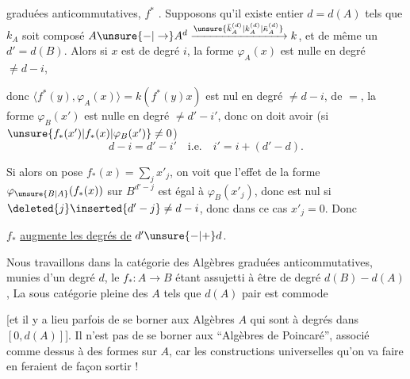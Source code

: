graduées anticommutatives, $f^*$ . Supposons qu'il existe  entier $d=d(A)$ tels que $k_A$ soit composé $A\unsure{-|\to}A^d\xrightarrow{\unsure{\bar k_A^{(d)}|k_A^{(d)}|\bar{\kappa}_A^{(d)}}} k$, et de même un $d'=d(B)$. Alors si $x$ est de degré $i$, la forme $\varphi_A(x)$ est nulle en degré $\ne d-i$,

donc $\langle f^*(y),\varphi_A(x)\rangle=k(f^*(y)x)$ est nul  en degré $\ne d-i$,  de $=$,  la forme $\varphi_B(x')$ est nulle en degré $\ne d'-i'$, donc on doit avoir (si $\unsure{f_*(x')|f_*(x)|\varphi_B(x')}\ne0$)
\[
d-i=d'-i'\quad\text{i.e.}\quad i'=i+(d'-d).
\]

Si alors on pose $f_*(x)=\sum_j x'_j$, on voit que l'effet de la forme $\varphi_{\unsure{B|A}}(f_*(x))$ sur $B^{d'-j}$ est égal à $\varphi_B(x'_j)$, donc est nul si $\deleted{j}\inserted{d'-j}\ne d-i$, donc dans ce cas $x'_j=0$. Donc

$f_*$ \uline{augmente les degrés de} $d'\unsure{-|+}d$.

Nous travaillons dans la catégorie  des Algèbres graduées anticommutatives, munies d'un degré $d$, le $f_*:A\to B$ étant assujetti à être de degré $d(B)-d(A)$,  La sous catégorie pleine des $A$ tels que $d(A)$ pair est commode

[et il y a lieu parfois de se borner aux Algèbres $A$ qui sont à degrés  dans $[0,d(A)]$]. Il n'est pas   de se borner aux ``Algèbres de Poincaré'', associé comme dessus à des formes sur $A$, car les constructions universelles qu'on va faire en feraient de  façon sortir !

